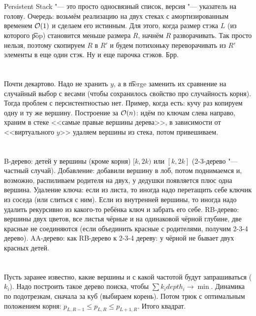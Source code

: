 \section{} %
Persistent Stack "--- это просто односвязный список, версия "--- указатель на голову.
Очередь: возьмём реализацию на двух стеках с амортизированным временем $\mathcal{O}(1)$ и сделаем его истинным.
Для этого, когда размер стэка $L$ (из которого \t{pop}) становится меньше размера $R$, начнём $R$ разворачивать.
Так просто нельзя, поэтому скопируем $R$ в $R'$ и будем потихоньку переворачивать из $R'$ элементы в еще один стэк.
Ну и еще парочка стэков.
Брр.
\TODO

\section{} %
Почти декартово.
Надо не хранить $y$, а в \t{merge} заменить их сравнение на случайный выбор с весами
(чтобы сохранилось свойство про случайность корня).
Тогда проблем с персистентностью нет.
Пример, когда есть: кучу раз копируем одну и ту же вершину.
Построение за $\mathcal{O}(n)$: идём по ключам слева направо, храним в стеке <<самые правые вершины дерева>>,
в зависимости от <<виртуального $y$>> удаляем вершины из стека, потом привешиваем.

\section{} %
B-дерево: детей у вершины (кроме корня) $[k, 2k)$ или $[k,2k]$ (2-3-дерево "--- частный случай).
Добавление: добавили вершину в лоб, потом поднимаемся и, возможно, распиливаем родителя на двух,
у дедушки появляется плюс одна вершина.
Удаление ключа: если из листа, то иногда надо перетащить себе ключик из соседа (или слиться с ним).
Если из внутренней вершины, то иногда надо удалить рекурсивно из какого-то ребёнка ключ и забрать его себе.
RB-дерево: вершины двух цветов, все листья чёрные и на одинаковой чёрной глубине,
две красные не соединяются (если объединить красные с родителями, получим 2-3-4 дерево).
AA-дерево: как RB-дерево к 2-3-4 дереву: у чёрной не бывает двух красных детей.

\section{} %
Пусть заранее известно, какие вершины и с какой частотой будут запрашиваться ($k_i$).
Надо построить такое дерево поиска, чтобы $\sum k_i depth_i \to \min$.
Динамика по подотрезкам, сначала за куб (выбираем корень).
Потом трюк с оптимальным положением корня: $p_{L,R-1} \le p_{L,R} \le p_{L+1,R}$.
Итого квадрат.
